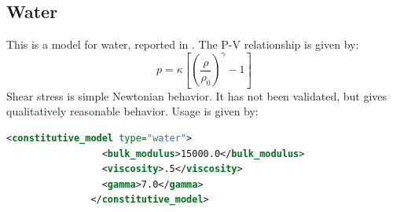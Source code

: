 \subsection{Water}  This is a model for water, reported in \cite{water_model_ref}.
The P-V relationship is given by:
\begin{equation}
p=\kappa\left[\left(\frac{\rho}{\rho_0}\right)^{\gamma} - 1\right]
\end{equation}
Shear stress is simple Newtonian behavior.  It has not been validated,
but gives qualitatively reasonable behavior.  Usage is given by:
\begin{lstlisting}[language=XML]
              <constitutive_model type="water">
                 <bulk_modulus>15000.0</bulk_modulus>
                 <viscosity>.5</viscosity>
                 <gamma>7.0</gamma>
               </constitutive_model>
\end{lstlisting}
